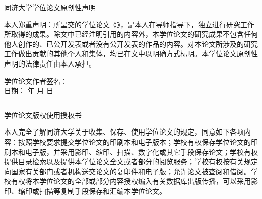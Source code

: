\cleardoublepage
\makeatother

\makeatletter 
\vspace*{-0.1cm}
\begin{center}
  \heiti\erhao 同济大学学位论文原创性声明
\end{center}
\vskip4pt\sihao[1.5]\par
本人郑重声明：所呈交的学位论文《\tongji@cheadingtitlenew》，是本人在导师指导下，独立进行研究工作所取得的成果。除文中已经注明引用的内容外，本学位论文的研究成果不包含任何他人创作的、已公开发表或者没有公开发表的作品的内容。对本论文所涉及的研究工作做出贡献的其他个人和集体，均已在文中以明确方式标明。本学位论文原创性声明的法律责任由本人承担。 \par
\begingroup
  \parindent0pt
  \hspace*{7.5cm} 学位论文作者签名： \relax\hspace*{1cm}\\[3pt]
  \hspace*{7.5cm} 日期： \hspace{1em} 年 \hspace{1.5em} 月 \hspace{1.5em} 日 \relax\hspace*{1cm}
\endgroup

\vspace*{0.5cm}
\hrule

\makeatletter

\vspace*{-0.1cm}
\begin{center}
  \heiti\erhao 学位论文版权使用授权书
\end{center}
\vskip4pt\sihao[1.5]\par
本人完全了解同济大学关于收集、保存、使用学位论文的规定，同意如下各项内容：按照学校要求提交学位论文的印刷本和电子版本；学校有权保存学位论文的印刷本和电子版，并采用影印、缩印、扫描、数字化或其它手段保存论文；学校有权提供目录检索以及提供本学位论文全文或者部分的阅览服务；学校有权按有关规定向国家有关部门或者机构送交论文的复印件和电子版；允许论文被查阅和借阅。学校有权将本学位论文的全部或部分内容授权编入有关数据库出版传播，可以采用影印、缩印或扫描等复制手段保存和汇编本学位论文。 \par

